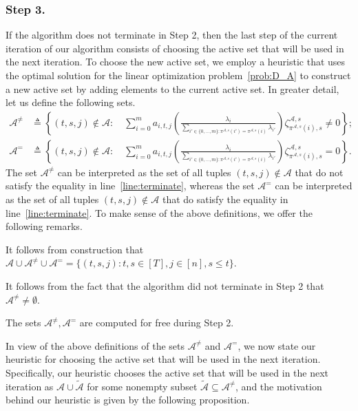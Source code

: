 \documentclass[nonblindrev,mnsc]{informs3} %
\begin{document}
\subsubsection*{Step 3.}
 If the algorithm does not terminate in Step 2, then the last step of the current iteration of our algorithm consists of choosing the active set that will be used in the next iteration. To choose the new active set, we employ a heuristic that uses the optimal solution for the linear optimization problem~\eqref{prob:D_A} to construct a new active set by adding elements to the current  active set. In greater detail, let us define the following sets.
 \begin{align*}
 \mathcal{A}^{\neq} &\triangleq \left \{(t,s,j) \notin \mathcal{A}:  \quad  \sum_{i=0}^m   a_{i,t,j} \left( \frac{\lambda_i}{\sum_{i' \in \{0,\ldots,m\}: \pi^{\mathcal{A},s}(i') = \pi^{\mathcal{A},s}(i)} \lambda_{i'}} \right) \zeta^{\mathcal{A},s}_{\pi^{\mathcal{A},s}(i),s} \neq 0 \right \};\\
  \mathcal{A}^{=} &\triangleq \left \{(t,s,j) \notin \mathcal{A}:  \quad  \sum_{i=0}^m   a_{i,t,j} \left( \frac{\lambda_i}{\sum_{i' \in \{0,\ldots,m\}: \pi^{\mathcal{A},s}(i') = \pi^{\mathcal{A},s}(i)} \lambda_{i'}} \right) \zeta^{\mathcal{A},s}_{\pi^{\mathcal{A},s}(i),s} = 0 \right \}.
 \end{align*}
  The set $ \mathcal{A}^{\neq}$ can be interpreted as the set of all tuples $(t,s,j) \notin \mathcal{A}$ that do not satisfy the equality in line~\eqref{line:terminate}, whereas the set $\mathcal{A}^=$ can be interpreted as the set of all tuples $(t,s,j) \notin \mathcal{A}$ that do satisfy the equality in line~\eqref{line:terminate}. To make sense of the above definitions, we offer the following remarks.
  \begin{remark}
   It follows from construction that $\mathcal{A} \cup \mathcal{A}^{\neq} \cup \mathcal{A}^= = \{(t,s,j): t,s \in [T], j \in [n], s \le t \}$.
   \end{remark}
  \begin{remark}
It follows from the fact that the algorithm did not terminate in Step 2 that $\mathcal{A}^{\neq} \neq \emptyset$. 
\end{remark}
\begin{remark}
The sets $\mathcal{A}^{\neq}, \mathcal{A}^=$ are computed for free during Step 2. 
\end{remark}
In view of the above definitions of the sets $\mathcal{A}^{\neq}$ and $\mathcal{A}^=$, we now state our heuristic for  choosing the active set that will be used in the next iteration. Specifically, our heuristic chooses the active set that will be used in the next iteration as $\mathcal{A} \cup \widetilde{\mathcal{A}}$ for some nonempty subset $\widetilde{\mathcal{A}} \subseteq \mathcal{A}^{\neq}$, and the motivation behind our heuristic is given by the following proposition. 
\end{document}
